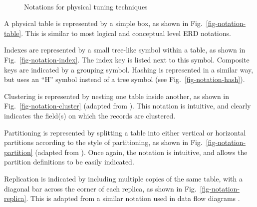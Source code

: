 \documentclass{llncs}
\begin{document}
\begin{figure}
	\hfill
	\hfill	\\
	\caption{Notations for physical tuning techniques}
	\label{fig-notation}
\end{figure}

A physical table is represented by a simple box, as shown in
Fig.~\ref{fig-notation-table}. This is similar to most logical and
conceptual level ERD notations.

Indexes are represented by a small tree-like symbol within a table, as
shown in Fig.~\ref{fig-notation-index}. The index key is listed next to
this symbol. Composite keys are indicated by a grouping symbol. Hashing
is represented in a similar way, but uses an ``H'' symbol instead of a
tree symbol (see Fig.~\ref{fig-notation-hash}).

Clustering is represented by nesting one table inside another, as shown
in Fig.~\ref{fig-notation-cluster} (adapted from
\cite{BeDa-P-1992-PDD}). This notation is intuitive, and clearly
indicates the field(s) on which the records are clustered.

Partitioning is represented by splitting a table into either vertical or
horizontal partitions according to the style of partitioning, as shown
in Fig.~\ref{fig-notation-partition} (adapted from
\cite{Silb-A-2002-4E}). Once again, the notation is intuitive, and
allows the partition definitions to be easily indicated.

Replication is indicated by including multiple copies of the same table,
with a diagonal bar across the corner of each replica, as shown in
Fig.~\ref{fig-notation-replica}. This is adapted from a similar notation
used in data flow diagrams \cite{Gane-C-1979}.

% 
\end{document}
